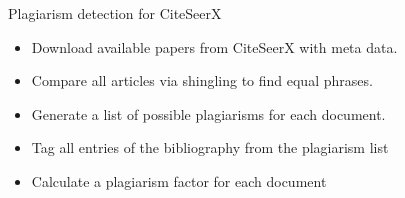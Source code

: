 \begin{frame}[c]
{Plagiarism detection for CiteSeerX}
\begin{itemize}
  \begin{itemize}
  \item Download available papers from CiteSeerX with meta data.
  \item Compare all articles via shingling to find equal phrases.
  \item Generate a list of possible plagiarisms for each document.
  \item Tag all entries of the bibliography from the plagiarism list
  \item Calculate a plagiarism factor for each document
\end{itemize} 
\end{itemize}
\end{frame} 